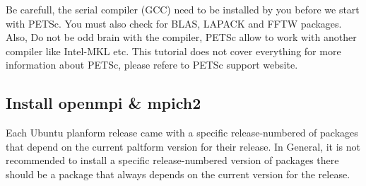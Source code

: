 \documentclass{article}
\begin{document}
Be carefull, the serial compiler (GCC) need to be installed by you before we start with PETSc. You must also check for BLAS, LAPACK and FFTW packages.
Also, Do not be odd brain with the compiler, PETSc allow to work with another compiler like Intel-MKL etc. This tutorial does not cover
everything for more information about PETSc, please refere to PETSc support website.

\subsection{Install openmpi \& mpich2}
Each Ubuntu planform release came with a specific release-numbered of packages that depend on the current paltform version for their release.  
In General, it is not recommended to install a specific release-numbered version of packages there should be a package that always depends on the current version for the release.
\end{document}
